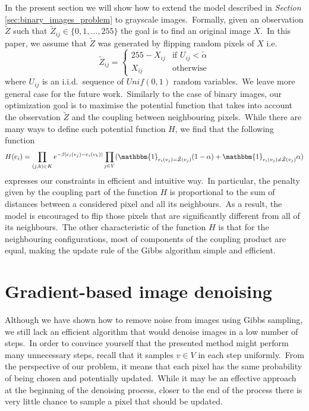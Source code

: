 \documentclass[shortabstract, english, lic]{iithesis}
\newcommand\numberedchapter[1]{\setlength\topskip{3cm}\chapter{#1}\setlength\topskip{0cm}}
\theoremstyle{default_theorem_style}\newtheorem{theorem}{Theorem}
\theoremstyle{default_theorem_style}\newtheorem{definition}{Definition}
\begin{document}
In the present section we will show how to extend the model described in \textit{Section}
\ref{sec:binary_images_problem} to grayscale images.\ Formally, given an observation $\tilde{Z}$ such
that $\tilde{Z}_{ij} \in \{0, 1, \dots, 255\}$ the goal is to find an original image $X$.\ In this paper, we assume
that $\tilde{Z}$ was generated by flipping random pixels of $X$ i.e.
$$
\tilde{Z}_{ij} =
\begin{cases}
  255 - X_{ij} &\text{if $U_{ij} < \tilde{\alpha}$}\\
  X_{ij} &\text{otherwise}
\end{cases}
$$
where $U_{ij}$ is an i.i.d.\ sequence of $Unif(0, 1)$ random variables.\ We leave more general case for the future
work.\ Similarly to the case of binary images, our optimization goal is to maximise the potential function that
takes into account the observation $\tilde{Z}$ and the coupling between neighbouring pixels.\ While there are many
ways to define such potential function $H$, we find that the following function
$$
H(e_i) = \prod\limits_{(j, k) \in K} e^{-\beta |e_i(v_j) - e_i(v_k)|}
\prod\limits_{j \in V}(\mathbbm{1}_{e_i(v_j) = \tilde{Z}(v_j)}(1 - \alpha) +
\mathbbm{1}_{e_i(v_j) \neq \tilde{Z}(v_j)}\alpha)
$$
expresses our constraints in efficient and intuitive way.\ In particular, the penalty given by the coupling part of
the function $H$ is proportional to the sum of distances between a considered pixel and all its neighbours.\ As a
result, the model is encouraged to flip those pixels that are significantly different from all of its
neighbours.\ The other characteristic of the function $H$ is that for the neighbouring configurations, most of
components of the coupling product are equal, making the update rule of the Gibbs algorithm simple and efficient.

\numberedchapter{Gradient-based image denoising}

Although we have shown how to remove noise from images using Gibbs sampling, we still lack an efficient algorithm
that would denoise images in a low number of steps.\ In order to convince yourself that the presented method
might perform many unnecessary steps, recall that it samples $v \in V$ in each step uniformly.\ From the perspective
of our problem, it means that each pixel has the same probability of being chosen and potentially updated.\ While
it may be an effective approach at the beginning of the denoising process, closer to the end of the process there is
very little chance to sample a pixel that should be updated.\newline
\end{document}

